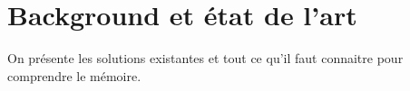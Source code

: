 
\chapter{Background et état de l'art} %
\label{chapter_background} %
On présente les solutions existantes et tout ce qu'il faut connaitre pour comprendre le mémoire.
\cite{messiarima}
